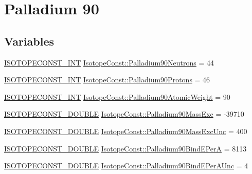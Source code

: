 \hypertarget{group___isotope_const-_palladium-_pd90}{}\section{Palladium 90}
\label{group___isotope_const-_palladium-_pd90}
\subsection*{Variables}
\begin{DoxyCompactItemize}
\item 
\mbox{\hyperlink{group___isotope_const-_macros_ga5f18360b3e99483a35c32d789e62621c}{I\+S\+O\+T\+O\+P\+E\+C\+O\+N\+S\+T\+\_\+\+I\+NT}} \mbox{\hyperlink{group___isotope_const-_palladium-_pd90_gab68d811b9dd299042939facc2c4937c9}{Isotope\+Const\+::\+Palladium90\+Neutrons}} = 44
\item 
\mbox{\hyperlink{group___isotope_const-_macros_ga5f18360b3e99483a35c32d789e62621c}{I\+S\+O\+T\+O\+P\+E\+C\+O\+N\+S\+T\+\_\+\+I\+NT}} \mbox{\hyperlink{group___isotope_const-_palladium-_pd90_gadc101ec7ca652fd79f623a062336d3fd}{Isotope\+Const\+::\+Palladium90\+Protons}} = 46
\item 
\mbox{\hyperlink{group___isotope_const-_macros_ga5f18360b3e99483a35c32d789e62621c}{I\+S\+O\+T\+O\+P\+E\+C\+O\+N\+S\+T\+\_\+\+I\+NT}} \mbox{\hyperlink{group___isotope_const-_palladium-_pd90_ga247c13b93d691484c22de42ee18c9520}{Isotope\+Const\+::\+Palladium90\+Atomic\+Weight}} = 90
\item 
\mbox{\hyperlink{group___isotope_const-_macros_ga8f45a7272ce02c0b4c65c44636ed719a}{I\+S\+O\+T\+O\+P\+E\+C\+O\+N\+S\+T\+\_\+\+D\+O\+U\+B\+LE}} \mbox{\hyperlink{group___isotope_const-_palladium-_pd90_ga31bfa69284300860609f39605be15f83}{Isotope\+Const\+::\+Palladium90\+Mass\+Exc}} = -\/39710
\item 
\mbox{\hyperlink{group___isotope_const-_macros_ga8f45a7272ce02c0b4c65c44636ed719a}{I\+S\+O\+T\+O\+P\+E\+C\+O\+N\+S\+T\+\_\+\+D\+O\+U\+B\+LE}} \mbox{\hyperlink{group___isotope_const-_palladium-_pd90_ga303144af0f709de18acdfebfda9c11bb}{Isotope\+Const\+::\+Palladium90\+Mass\+Exc\+Unc}} = 400
\item 
\mbox{\hyperlink{group___isotope_const-_macros_ga8f45a7272ce02c0b4c65c44636ed719a}{I\+S\+O\+T\+O\+P\+E\+C\+O\+N\+S\+T\+\_\+\+D\+O\+U\+B\+LE}} \mbox{\hyperlink{group___isotope_const-_palladium-_pd90_ga45b9f9d9ab32f1104a08cf1b076faf8b}{Isotope\+Const\+::\+Palladium90\+Bind\+E\+PerA}} = 8113
\item 
\mbox{\hyperlink{group___isotope_const-_macros_ga8f45a7272ce02c0b4c65c44636ed719a}{I\+S\+O\+T\+O\+P\+E\+C\+O\+N\+S\+T\+\_\+\+D\+O\+U\+B\+LE}} \mbox{\hyperlink{group___isotope_const-_palladium-_pd90_ga117388e498531058af19fc024ce61153}{Isotope\+Const\+::\+Palladium90\+Bind\+E\+Per\+A\+Unc}} = 4

\end{DoxyCompactItemize}
